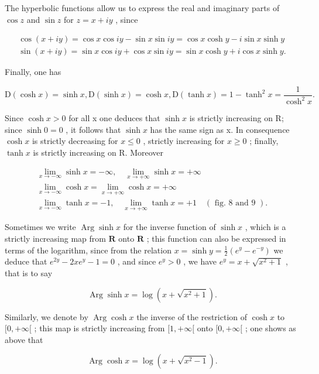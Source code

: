 The hyperbolic functions allow us to express the real and imaginary parts of \(\cos z\) and \(\sin z\) for \(z = x + iy\) , since

\[
\begin{array}{l} \cos (x + i y) = \cos x \cos i y - \sin x \sin i y = \cos x \cosh y - i \sin x \sinh y \\ \sin (x + i y) = \sin x \cos i y + \cos x \sin i y = \sin x \cosh y + i \cos x \sinh y. \end{array}
\]

Finally, one has

\[
\mathrm{D} (\cosh x) = \sinh x, \mathrm{D} (\sinh x) = \cosh x, \mathrm{D} (\tanh x) = 1 - \tanh ^ {2} x = \frac {1}{\cosh^ {2} x}.
\]

Since \(\cosh x > 0\) for all x one deduces that \(\sinh x\) is strictly increasing on R; since \(\sinh 0 = 0\) , it follows that \(\sinh x\) has the same sign as x. In consequence \(\cosh x\) is strictly decreasing for \(x \leqslant 0\) , strictly increasing for \(x \geqslant 0\) ; finally, \(\tanh x\) is strictly increasing on R. Moreover

\[
\begin{array}{l} \lim _ {x \to - \infty} \sinh x = - \infty , \quad \lim _ {x \to + \infty} \sinh x = + \infty \\ \lim _ {x \to - \infty} \cosh x = \lim _ {x \to + \infty} \cosh x = + \infty \\ \lim _ {x \to - \infty} \tanh x = - 1, \quad \lim _ {x \to + \infty} \tanh x = + 1 \quad (\text {   fig.   8   and   9   }). \end{array}
\]

Sometimes we write \(\operatorname{Arg}\sinh x\) for the inverse function of \(\sinh x\) , which is a strictly increasing map from \(\mathbf{R}\) onto \(\mathbf{R}\) ; this function can also be expressed in terms of the logarithm, since from the relation \(x = \sinh y = \frac{1}{2}(e^y - e^{-y})\) we deduce that \(e^{2y} - 2xe^y - 1 = 0\) , and since \(e^y > 0\) , we have \(e^y = x + \sqrt{x^2 + 1}\) , that is to say

\[
\operatorname{Arg} \sinh x = \log (x + \sqrt {x ^ {2} + 1}).
\]

Similarly, we denote by \(\operatorname{Arg}\cosh x\) the inverse of the restriction of \(\cosh x\) to \([0, +\infty[\) ; this map is strictly increasing from \([1, +\infty[\) onto \([0, +\infty[\) ; one shows as above that

\[
\operatorname{Arg} \cosh x = \log (x + \sqrt {x ^ {2} - 1}).
\]

